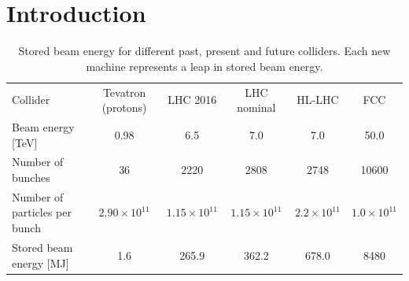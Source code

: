\documentclass[aps
,prstab
,reprint
,longbibliography
,preprintnumbers
,showkeys
,amsfonts,amssymb,amsmath
,floatfix
]{revtex4-1}
\begin{document}



\maketitle


\section{Introduction}
\label{sec:intro}

\begin{table}
  \caption{ Stored beam energy for different past, present and future
    colliders. Each new machine represents a leap in stored beam
    energy.}
  \label{tab:stored_energy}
  \begin{ruledtabular}
    \begin{tabular}{lccccc}
      Collider& Tevatron (protons) \cite{tevatron} & LHC 2016
                                                     \cite{Wenninger:IPAC:2017}
      & LHC nominal \cite{lhc_design} & HL-LHC \cite{hlcdr} & FCC \cite{Benedikt:JKPS:2016, Benedikt:IPAC:2018} \\
      \colrule
      Beam energy [TeV] & 0.98 & 6.5 & 7.0 & 7.0 & 50.0\\
      Number of bunches & 36 & 2220 & 2808 & 2748 & 10600 \\
      Number of particles per bunch & $2.90\times 10^{11}$ & $1.15\times 10^{11}$ & $1.15\times 10^{11}$ & $2.2\times 10^{11}$ & $1.0\times 10^{11}$\\
      Stored beam energy [MJ] & 1.6 & 265.9 & 362.2 & 678.0 & 8480 \\
    \end{tabular}
  \end{ruledtabular}
\end{table}
      
\end{document}
